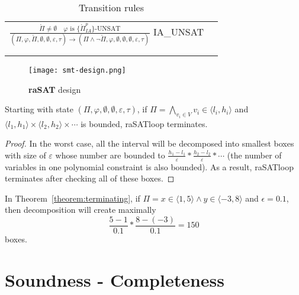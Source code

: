 \begin{table*}[t]
\begin{tabular}{ll}
  \large 
  $\frac{\mathring{\Pi} \not= \emptyset \quad \varphi \text{ is }  \{\mathring{\Pi}^p_{IA}\}\text{-UNSAT}}{(\Pi, \varphi, \mathring{\Pi}, \emptyset, \emptyset, \varepsilon, \tau) \to (\Pi \wedge \neg\mathring{\Pi}, \varphi, \emptyset, \emptyset, \emptyset, \varepsilon, \tau)}$ \tiny IA\_UNSAT \\\\
  \hline\\
  \end{tabular}
  \caption{Transition rules}\label{tab:transition-rules}
\end{table*}

\begin{figure}[ht]
\centering
\texttt{[image: smt-design.png]} 
\caption{\textbf{raSAT} design} 
\label{fig:smt-design} 
\end{figure}

\begin{theorem} \label{theorem:terminating}
Starting with state ${(\Pi, \varphi, \emptyset, \emptyset, \varepsilon, \tau)}$, if $\Pi = \bigwedge\limits_{v_i \in V} v_i \in \langle l_i, h_i \rangle$ and ${\langle l_1, h_1 \rangle \times \langle l_2, h_2 \rangle \times \cdots}$ is bounded, raSATloop terminates.
\end{theorem}

\begin{proof}
In the worst case, all the interval will be decomposed into smallest boxes with size of $\varepsilon$ whose number are bounded to $\frac{h_1 - l_1}{\varepsilon}*\frac{h_2 - l_2}{\varepsilon}*\cdots$ (the number of variables in one polynomial constraint is also bounded). As a result, raSATloop terminates after checking all of these boxes.
\end{proof}

\begin{example}
In Theorem~\ref{theorem:terminating}, if $\Pi= x \in \langle 1, 5 \rangle \wedge y \in \langle -3, 8 \rangle$ and $\epsilon = 0.1$, then decomposition will create maximally \[\frac{5 - 1}{0.1}*\frac{8 - (-3)}{0.1} = 150\] boxes.
\end{example}

\section{Soundness - Completeness}
